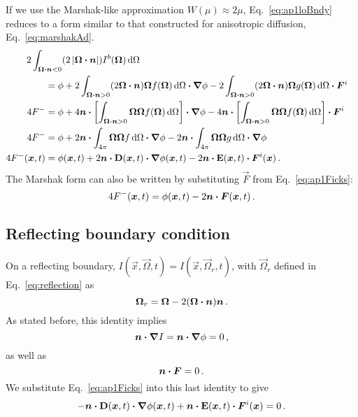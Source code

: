 If we use the Marshak-like approximation $W(\mu)\approx 2\mu$,
Eq.~\eqref{eq:ap1loBndy} reduces to a form similar to that constructed for
anisotropic diffusion, Eq.~\eqref{eq:marshakAd}.
\begin{align}\nonumber
  \lefteqn{2\int_{\vec{\Omega}\vd \vec{n} < 0}
  ( 2\abs{\vec{\Omega} \vd \vec{n}} ) I^b(\vec{\Omega}) \ud\Omega}\qquad
\\ \nonumber
  &= \phi
  + 2\int_{\vec{\Omega}\vd \vec{n} > 0} ( 2\vec{\Omega} \vd \vec{n} )
  \vec{\Omega} f(\vec{\Omega}) \ud\Omega \vd \grad \phi
  - 2\int_{\vec{\Omega}\vd \vec{n} > 0} ( 2\vec{\Omega} \vd \vec{n} )
  \vec{\Omega} g(\vec{\Omega}) \ud\Omega \vd \vec{F}^i
\\ \nonumber
  4 F^-
  &= \phi
  + 4 \vec{n} \vd \left[ \int_{\vec{\Omega}\vd \vec{n} > 0} \vec{\Omega}
  \vec{\Omega} f(\vec{\Omega}) \ud\Omega \right] \vd \grad \phi
  - 4 \vec{n} \vd \left[ \int_{\vec{\Omega}\vd \vec{n} > 0} \vec{\Omega}
  \vec{\Omega} f(\vec{\Omega}) \ud\Omega \right] \vd \vec{F}^i
\\ \nonumber
  4 F^-
  &= \phi
  + 2 \vec{n} \vd \int_{4\pi} \vec{\Omega} \vec{\Omega} f \ud\Omega \vd \grad
  \phi
  - 2 \vec{n} \vd \int_{4\pi} \vec{\Omega} \vec{\Omega} g \ud\Omega \vd \grad
  \phi
\\ \label{eq:ap1marshak}
  4 F^-(\vec{x}, t)
  &= \phi(\vec{x}, t)
  + 2 \vec{n} \vd \Dtens(\vec{x},t) \vd \grad \phi(\vec{x}, t)
  - 2 \vec{n} \vd \Etens(\vec{x},t) \vd \vec{F}^i(\vec{x}) \,.
\end{align}
The Marshak form can also be written by substituting $\vec{F}$ from
Eq.~\eqref{eq:ap1Ficks}:
\begin{equation} \label{eq:ap1marshak2}
  4 F^-(\bm{x}, t)
  = \phi(\bm{x}, t)
  - 2 \bm{n} \bm{\cdot} \bm{F}(\bm{x}, t) \,.
\end{equation}

\subsection{Reflecting boundary condition}
On a reflecting boundary, $I(\vec{x},\vec{\Omega},t) =
I(\vec{x},\vec{\Omega}_r,t)$, with $\vec{\Omega}_r$ defined in
Eq.~\eqref{eq:reflection} as
\begin{equation*}
  \bm{\Omega}_r = \bm{\Omega} - 2(\bm{\Omega} \bm{\cdot} \bm{n}) \bm{n}\,.
\end{equation*}
As stated before, this identity implies
\begin{equation*}
  \bm{n}\bm{\cdot} \bm{\nabla} I = \bm{n} \bm{\cdot} \bm{\nabla} \phi = 0\,,
\end{equation*}
as well as
\begin{equation*}
  \bm{n}\bm{\cdot}\bm{F}=0\,.
\end{equation*}
We substitute Eq.~\eqref{eq:ap1Ficks} into this last identity to give
\begin{equation}\label{eq:ap1LoRefl1}
  - \bm{n}\bm{\cdot} \mathbf{D}(\bm{x},t) \bm{\cdot} \bm{\nabla} \phi(\bm{x},t)
  + \bm{n}\bm{\cdot} \mathbf{E}(\bm{x},t) \bm{\cdot} \bm{F}^i(\bm{x}) = 0\,.
\end{equation}

